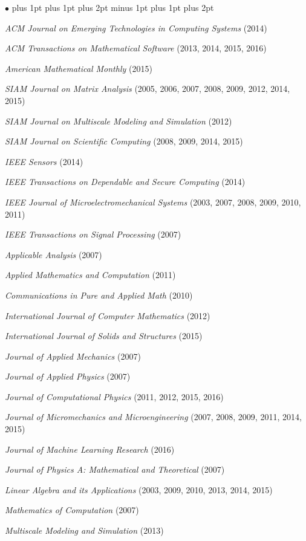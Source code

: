 \documentclass{article}
\newenvironment{icompact}{
  \begin{list}{$\bullet$}{
    \parsep 0pt plus 1pt
    \partopsep 0pt plus 1pt
    \topsep 2pt plus 2pt minus 1pt
    \itemsep 0pt plus 1pt
    \parskip 0pt plus 2pt
    \leftmargin 0.3in}
       \raggedright}
  {\normalsize\end{list}}
\begin{document}
\begin{icompact}
  \item {\em ACM Journal on Emerging Technologies in Computing Systems} (2014)
  \item {\em ACM Transactions on Mathematical Software} (2013, 2014,
    2015, 2016)
  \item {\em American Mathematical Monthly} (2015)
  \item {\em SIAM Journal on Matrix Analysis} (2005, 2006, 2007, 2008,
    2009, 2012, 2014, 2015)
  \item {\em SIAM Journal on Multiscale Modeling and Simulation} (2012)
  \item {\em SIAM Journal on Scientific Computing} (2008, 2009, 2014, 2015)
  \item {\em IEEE Sensors} (2014)
  \item {\em IEEE Transactions on Dependable and Secure Computing} (2014)
  \item {\em IEEE Journal of Microelectromechanical Systems} (2003,
    2007, 2008, 2009, 2010, 2011)
  \item {\em IEEE Transactions on Signal Processing} (2007)
  \item {\em Applicable Analysis} (2007)
  \item {\em Applied Mathematics and Computation} (2011)
  \item {\em Communications in Pure and Applied Math} (2010)
  \item {\em International Journal of Computer Mathematics} (2012)
  \item {\em International Journal of Solids and Structures} (2015)
  \item {\em Journal of Applied Mechanics} (2007)
  \item {\em Journal of Applied Physics} (2007)
  \item {\em Journal of Computational Physics} (2011, 2012, 2015, 2016)
  \item {\em Journal of Micromechanics and Microengineering} (2007,
    2008, 2009, 2011, 2014, 2015)
  \item {\em Journal of Machine Learning Research} (2016)
  \item {\em Journal of Physics A: Mathematical and Theoretical} (2007)
  \item {\em Linear Algebra and its Applications} (2003, 2009, 2010,
    2013, 2014, 2015)
  \item {\em Mathematics of Computation} (2007)
  \item {\em Multiscale Modeling and Simulation} (2013)

\end{icompact}
\end{document}
